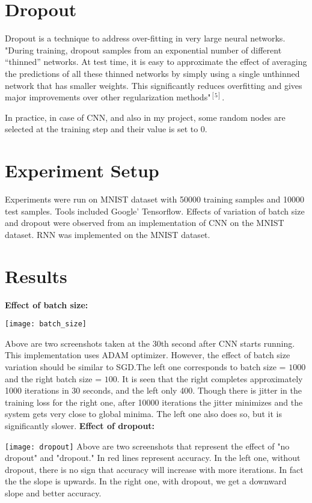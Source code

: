 \documentclass{article}
\begin{document}
 \section*{Dropout}
 Dropout is a technique to address over-fitting in very large neural networks. "During training,
 dropout samples from an exponential number of different “thinned” networks. At test time,
 it is easy to approximate the effect of averaging the predictions of all these thinned networks
 by simply using a single unthinned network that has smaller weights. This significantly
 reduces overfitting and gives major improvements over other regularization methods"$^{[5]}$.
 
 In practice, in case of CNN, and also in my project, some random nodes are selected at the training step and their value is set to $0$. 
 
 \section*{Experiment Setup}
 Experiments were run on MNIST dataset with 50000 training samples and 10000 test samples. Tools included Google' Tensorflow. Effects of variation of batch size and dropout were observed from an implementation of CNN on the MNIST dataset. RNN was implemented on the MNIST dataset.
 
 \section*{Results}
\textbf{Effect of batch size:}
  
\texttt{[image: batch\_size]}
  
  Above are two screenshots taken at the 30th second after CNN starts running. This implementation uses ADAM optimizer. However, the effect of batch size variation should be similar to SGD.The left one corresponds to batch size = $1000$ and the right batch size =  $100$. It is seen that the right completes approximately 1000 iterations in 30 seconds, and the left only 400. Though there is jitter in the training loss for the right one, after 10000 iterations the jitter minimizes and the system gets very close to global minima. The left one also does so, but it is significantly slower.
 \newpage
\textbf{Effect of dropout:}

\texttt{[image: dropout]}
Above are two screenshots that represent the effect of "no dropout" and "dropout." In red lines represent accuracy. In the left one, without dropout, there is no sign that accuracy will increase with more iterations. In fact the the slope is upwards. In the right one, with dropout, we get a downward slope and better accuracy.
\end{document}
